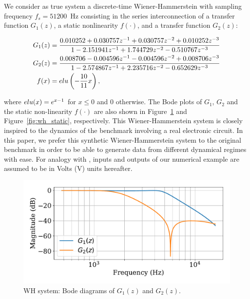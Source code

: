 \documentclass{ifacconf}
\begin{document}
We consider as true system a discrete-time Wiener-Hammerstein with sampling frequency $f_s=51200$~Hz consisting in the series interconnection of a transfer function $G_1(z)$, a static nonlinearity $f(\cdot)$, and a transfer function $G_2(z)$:
\begin{small}
\begin{align*}
 G_1(z) &= \frac{0.010252 + 0.030757z^{-1} + 0.030757z^{-2} + 0.010252z^{-3}}{ 1 -2.151941z^{-1} + 1.744729z^{-2} -0.510767z^{-3}}\\
 G_2(z) &= \frac{0.008706 -0.004596z^{-1} - 0.004596z^{-2} + 0.008706z^{-3}}{1 -2.574867z^{-1} + 2.235716z^{-2} -0.652629z^{-3}}\\
 f(x) &= {\rm elu}\left (-\frac{10}{11}x \right ),
 \end{align*}
\end{small}
where ${\rm elu}(x) = e^{x-1}$ for $x \leq 0$ and $0$ otherwise.
The Bode plots of $G_1$, $G_2$ and the static non-linearity $f(\cdot)$ are also shown in Figure~\ref{fig:wh_bode} and Figure~\ref{fig:wh_static}, respectively.
{
This Wiener-Hammerstein system is closely inspired to the dynamics of the benchmark \citet{schoukens2009wiener} involving a real electronic circuit. In this paper, we prefer this synthetic Wiener-Hammerstein system to the original benchmark in order to be able to generate data from different dynamical regimes with ease.} %
{For analogy with \citet{schoukens2009wiener}, inputs and outputs of our numerical example are assumed to be in Volts (V) units hereafter.}
\begin{figure}
 \centering
 \includegraphics[width=.9\linewidth]{img/wh_bode_mag.pdf}
 \caption{WH system: Bode diagrams of $G_1(z)$ and $G_2(z)$.}
 \label{fig:wh_bode}
\end{figure}
\end{document}
